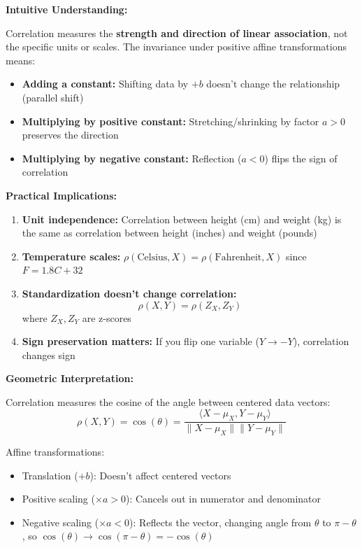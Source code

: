 \documentclass[12pt]{article}
\begin{document}
\begin{explanation}
\textbf{Intuitive Understanding:}

Correlation measures the \textbf{strength and direction of linear association}, not the specific units or scales. The invariance under positive affine transformations means:

\begin{itemize}
    \item \textbf{Adding a constant:} Shifting data by \(+b\) doesn't change the relationship (parallel shift)
    \item \textbf{Multiplying by positive constant:} Stretching/shrinking by factor \(a > 0\) preserves the direction
    \item \textbf{Multiplying by negative constant:} Reflection (\(a < 0\)) flips the sign of correlation
\end{itemize}

\textbf{Practical Implications:}

\begin{enumerate}
    \item \textbf{Unit independence:} Correlation between height (cm) and weight (kg) is the same as correlation between height (inches) and weight (pounds)

    \item \textbf{Temperature scales:} \(\rho(\text{Celsius}, X) = \rho(\text{Fahrenheit}, X)\) since \(F = 1.8C + 32\)

    \item \textbf{Standardization doesn't change correlation:}
    \[
    \rho(X, Y) = \rho(Z_X, Z_Y)
    \]
    where \(Z_X, Z_Y\) are z-scores

    \item \textbf{Sign preservation matters:} If you flip one variable (\(Y \to -Y\)), correlation changes sign
\end{enumerate}

\textbf{Geometric Interpretation:}

Correlation measures the cosine of the angle between centered data vectors:
\[
\rho(X, Y) = \cos(\theta) = \frac{\langle X - \mu_X, Y - \mu_Y \rangle}{\|X - \mu_X\| \|Y - \mu_Y\|}
\]

Affine transformations:
\begin{itemize}
    \item Translation (\(+b\)): Doesn't affect centered vectors
    \item Positive scaling (\(\times a > 0\)): Cancels out in numerator and denominator
    \item Negative scaling (\(\times a < 0\)): Reflects the vector, changing angle from \(\theta\) to \(\pi - \theta\), so \(\cos(\theta) \to \cos(\pi - \theta) = -\cos(\theta)\)
\end{itemize}


\end{explanation}
\end{document}
